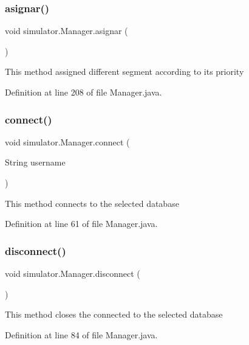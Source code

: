 \subsubsection{\texorpdfstring{asignar()}{asignar()}}
{\footnotesize\ttfamily void simulator.\+Manager.\+asignar (\begin{DoxyParamCaption}{ }\end{DoxyParamCaption})}

This method assigned different segment according to its priority 

Definition at line 208 of file Manager.\+java.

\mbox{\label{classsimulator_1_1_manager_adba6b4255dbc64064c6577e4baadbe9a}} 
\subsubsection{\texorpdfstring{connect()}{connect()}}
{\footnotesize\ttfamily void simulator.\+Manager.\+connect (\begin{DoxyParamCaption}\item[{String}]{username }\end{DoxyParamCaption})}

This method connects to the selected database 

Definition at line 61 of file Manager.\+java.

\mbox{\label{classsimulator_1_1_manager_af238d6fc1282f769de925bf6aa9cdca9}} 
\subsubsection{\texorpdfstring{disconnect()}{disconnect()}}
{\footnotesize\ttfamily void simulator.\+Manager.\+disconnect (\begin{DoxyParamCaption}{ }\end{DoxyParamCaption})}

This method closes the connected to the selected database 

Definition at line 84 of file Manager.\+java.

\mbox{\label{classsimulator_1_1_manager_a92b9df5fb7f406bfe8f99cdb8b6ee22a}} 
